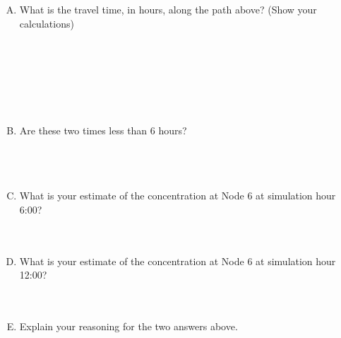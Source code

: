 \documentclass[11pt]{article}
\begin{document}
\begin{enumerate}
\begin{enumerate}[A)]
\item What is the travel time, in hours, along the path above? (Show your calculations) \\~\\~\\~\\~\\~\\~\\
\item Are these two times less than 6 hours? \\~\\~\\~\\
\item What is your estimate of the concentration at Node 6 at simulation hour 6:00? \\~\\~\\
\item What is your estimate of the concentration at Node 6 at simulation hour 12:00? \\~\\~\\
\item Explain your reasoning for the two answers above.
\end{enumerate}


\end{enumerate}
\end{document}
